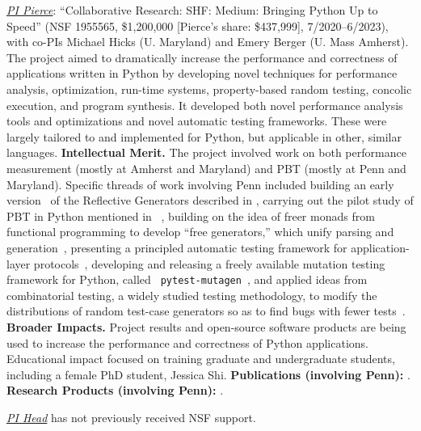{\emph{\underline{PI Pierce}}: ``Collaborative Research:
SHF: Medium: Bringing Python Up to Speed'' (NSF 1955565, \$1,200,000
[Pierce's share: \$437,999],
7/2020--6/2023), with co-PIs Michael Hicks (U. Maryland) and Emery Berger
(U. Mass Amherst).
The project aimed to dramatically increase the performance and
correctness of applications written in Python by developing novel
techniques for performance analysis, optimization, run-time systems,
property-based random testing, concolic execution, and program
synthesis. It developed both
novel performance analysis tools and optimizations and novel automatic
testing frameworks. These were largely tailored to and implemented for
Python, but applicable in other, similar languages.
%
{\bf Intellectual Merit.} The project involved work on both
performance measurement (mostly at Amherst and Maryland) and PBT (mostly at Penn
and Maryland).  Specific threads of work involving Penn included
building an early
version~\cite{goldstein2023reflecting} of the Reflective Generators described in
, carrying out the pilot study of PBT in Python
mentioned in
~\cite{goldstein_problems_2022},
building on the idea of
freer monads from functional programming to develop ``free
generators,'' which unify parsing and
generation~\cite{goldstein2022parsing},
presenting a principled
automatic testing framework for application-layer
protocols~\cite{Li2021:MBToNA}, developing and releasing a freely
available mutation testing framework for Python, called {\tt
  pytest-mutagen}~\cite{pytestmutagen}, and applied ideas from
combinatorial testing, a widely studied testing methodology, to modify
the distributions of random test-case generators so as to find bugs
with fewer tests~\cite{DBLP:conf/esop/GoldsteinHLP21}.
%
{\bf Broader Impacts.} Project results and open-source software
products are being used to increase the
performance and correctness of Python applications.
Educational impact focused on training graduate and
undergraduate students, including a female PhD student, Jessica
Shi.
%
{\bf Publications (involving Penn):} \cite{goldstein2023reflecting,DBLP:conf/esop/GoldsteinHLP21,
  goldstein2022parsing, goldstein_problems_2022, Li2021:MBToNA}.
{\bf Research Products (involving Penn):} \cite{pytestmutagen}.

\smallskip

\noindent\emph{\underline{PI Head}} has not previously received NSF support.

}
